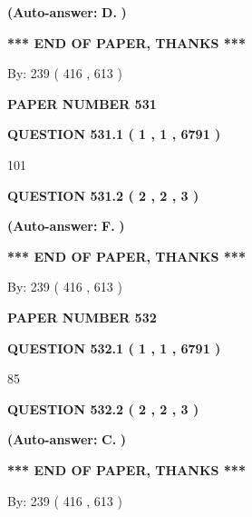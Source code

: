 \documentclass[12pt]{article}
\begin{document}
 
{\textbf{(Auto-answer:}}
{\textbf{\large{
D.}}}
{\textbf{)}}
 
 
   
   
   
   
\vspace{1.0in} 
{\textbf{\large{ *** END OF PAPER, THANKS *** }}} 
   
   
\hspace{1.0in} By: 
 239 ( 416 ,  613 )
   
   
   
   
\newpage 
\setcounter{page}{ 
   531001 } 
   
   
 {\textbf{ \Large{ PAPER NUMBER  531  }}}
   
   
   
   
  
  
{\textbf{\large{QUESTION
531.1 
 ( 1 , 1 , 6791 )
}}}

101
  
  
{\textbf{\large{QUESTION
531.2 
 ( 2 , 2 , 3 )
}}}
 
 
{\textbf{(Auto-answer:}}
{\textbf{\large{
F.}}}
{\textbf{)}}
 
 
   
   
   
   
\vspace{1.0in} 
{\textbf{\large{ *** END OF PAPER, THANKS *** }}} 
   
   
\hspace{1.0in} By: 
 239 ( 416 ,  613 )
   
   
   
   
\newpage 
\setcounter{page}{ 
   532001 } 
   
   
 {\textbf{ \Large{ PAPER NUMBER  532  }}}
   
   
   
   
  
  
{\textbf{\large{QUESTION
532.1 
 ( 1 , 1 , 6791 )
}}}

85
  
  
{\textbf{\large{QUESTION
532.2 
 ( 2 , 2 , 3 )
}}}
 
 
{\textbf{(Auto-answer:}}
{\textbf{\large{
C.}}}
{\textbf{)}}
 
 
   
   
   
   
\vspace{1.0in} 
{\textbf{\large{ *** END OF PAPER, THANKS *** }}} 
   
   
\hspace{1.0in} By: 
 239 ( 416 ,  613 )
   
   
   
\end{document}
